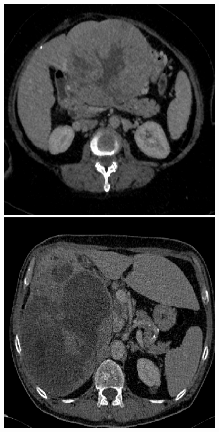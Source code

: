 \begin{figure}[!ht]
\begin{minipage}{4cm}
\includegraphics[width=\linewidth]{../SemanticSeg/images/2_3_raw_resized}
\end{minipage} \hspace{-0.3cm}
\begin{minipage}{4cm}
\includegraphics[width=\linewidth]{../SemanticSeg/images/5_4_raw_resized}

\end{minipage}
\end{figure}
